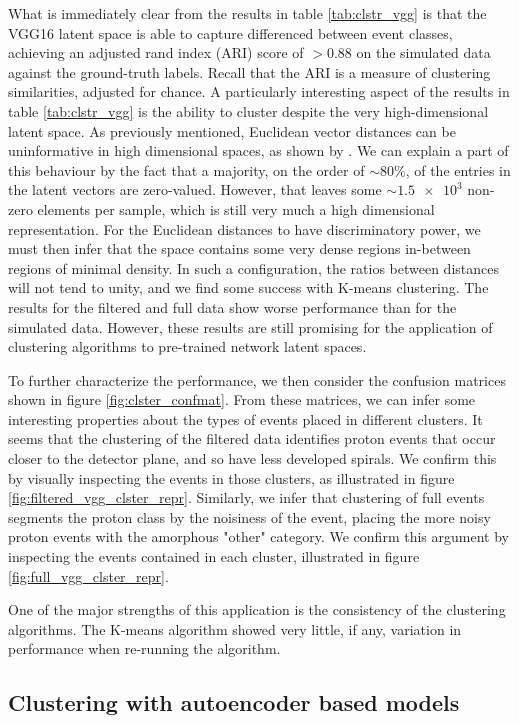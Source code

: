 What is immediately clear from the results in table \ref{tab:clstr_vgg} is that the VGG16 latent space is able to capture differenced between event classes, achieving an adjusted rand index (ARI) score of $>0.88$ on the simulated data against the ground-truth labels. Recall that the ARI is a measure of clustering similarities, adjusted for chance. A particularly interesting aspect of the results in table \ref{tab:clstr_vgg} is the ability to cluster despite the very high-dimensional latent space. As previously mentioned, Euclidean vector distances can be uninformative in high dimensional spaces, as shown by \cite{Aggarwal}. We can explain a part of this behaviour by the fact that a majority, on the order of $\sim 80\%$, of the entries in the latent vectors are zero-valued. However, that leaves some $\sim \num{1.5e3}$ non-zero elements per sample, which is still very much a high dimensional representation. For the Euclidean distances to have discriminatory power, we must then infer that the space contains some very dense regions in-between regions of minimal density. In such a configuration, the ratios between distances will not tend to unity, and we find some success with K-means clustering. The results for the filtered and full data show worse performance than for the simulated data. However, these results are still promising for the application of clustering algorithms to pre-trained network latent spaces.

To further characterize the performance, we then consider the confusion matrices shown in figure \ref{fig:clster_confmat}. From these matrices, we can infer some interesting properties about the types of events placed in different clusters. It seems that the clustering of the filtered data identifies proton events that occur closer to the detector plane, and so have less developed spirals. We confirm this by visually inspecting the events in those clusters, as illustrated in figure \ref{fig:filtered_vgg_clster_repr}. Similarly, we infer that clustering of full events segments the proton class by the noisiness of the event, placing the more noisy proton events with the amorphous "other" category. We confirm this argument by inspecting the events contained in each cluster, illustrated in figure \ref{fig:full_vgg_clster_repr}.

One of the major strengths of this application is the consistency of the clustering algorithms. The K-means algorithm showed very little, if any, variation in performance when re-running the algorithm. 

\subsection{Clustering with autoencoder based models}

